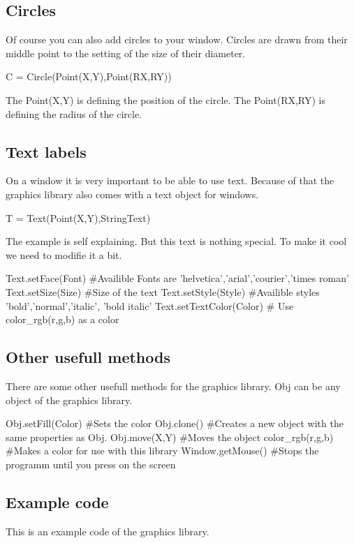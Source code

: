 \subsection{Circles}
Of course you can also add circles to your window. Circles are drawn from their middle point to the setting of the size of their diameter.
\begin{python}
C = Circle(Point(X,Y),Point(RX,RY))
\end{python}
The Point(X,Y) is defining the position of the circle. The Point(RX,RY) is defining the radius of the circle.

\subsection{Text labels}
On a window it is very important to be able to use text. Because of that the graphics library also comes with a text object for windows.
\begin{python}
T = Text(Point(X,Y),StringText)
\end{python}
The example is self explaining. But this text is nothing special. To make it cool we need to modifie it a bit.
\begin{fullwidth}
\begin{python}
Text.setFace(Font)
 #Availible Fonts are 'helvetica','arial','courier','times roman'
Text.setSize(Size) #Size of the text
Text.setStyle(Style)
 #Availible styles 'bold','normal','italic', 'bold italic'
Text.setTextColor(Color) # Use color_rgb(r,g,b) as a color
\end{python}
\end{fullwidth}

\newpage
\subsection{Other usefull methods}
There are some other usefull methods for the graphics library. Obj can be any object of the graphics library.
\begin{fullwidth}
\begin{python}
Obj.setFill(Color) #Sets the color
Obj.clone() #Creates a new object with the same properties as Obj.
Obj.move(X,Y) #Moves the object
color_rgb(r,g,b) #Makes a color for use with this library
Window.getMouse() #Stops the programm until you press on the screen
\end{python}
\end{fullwidth}

\subsection{Example code}
This is an example code of the graphics library.

